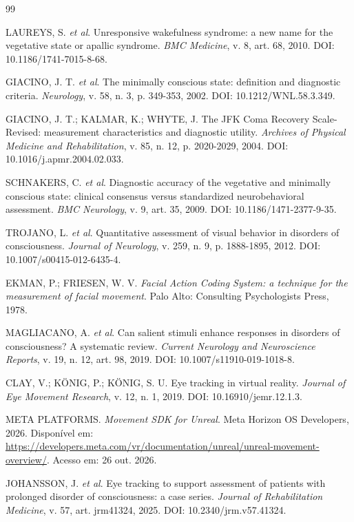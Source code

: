 \documentclass[conference,a4paper,10pt]{IEEEtran}
\begin{document}
\begin{thebibliography}{99}

 LAUREYS, S. \textit{et al}. Unresponsive wakefulness syndrome: a new name for the vegetative state or apallic syndrome. \textit{BMC Medicine}, v. 8, art. 68, 2010. DOI: 10.1186/1741-7015-8-68.

 GIACINO, J. T. \textit{et al}. The minimally conscious state: definition and diagnostic criteria. \textit{Neurology}, v. 58, n. 3, p. 349-353, 2002. DOI: 10.1212/WNL.58.3.349.

 GIACINO, J. T.; KALMAR, K.; WHYTE, J. The JFK Coma Recovery Scale-Revised: measurement characteristics and diagnostic utility. \textit{Archives of Physical Medicine and Rehabilitation}, v. 85, n. 12, p. 2020-2029, 2004. DOI: 10.1016/j.apmr.2004.02.033.

 SCHNAKERS, C. \textit{et al}. Diagnostic accuracy of the vegetative and minimally conscious state: clinical consensus versus standardized neurobehavioral assessment. \textit{BMC Neurology}, v. 9, art. 35, 2009. DOI: 10.1186/1471-2377-9-35.

 TROJANO, L. \textit{et al}. Quantitative assessment of visual behavior in disorders of consciousness. \textit{Journal of Neurology}, v. 259, n. 9, p. 1888-1895, 2012. DOI: 10.1007/s00415-012-6435-4.

 EKMAN, P.; FRIESEN, W. V. \textit{Facial Action Coding System: a technique for the measurement of facial movement}. Palo Alto: Consulting Psychologists Press, 1978.

 MAGLIACANO, A. \textit{et al}. Can salient stimuli enhance responses in disorders of consciousness? A systematic review. \textit{Current Neurology and Neuroscience Reports}, v. 19, n. 12, art. 98, 2019. DOI: 10.1007/s11910-019-1018-8.

 CLAY, V.; KÖNIG, P.; KÖNIG, S. U. Eye tracking in virtual reality. \textit{Journal of Eye Movement Research}, v. 12, n. 1, 2019. DOI: 10.16910/jemr.12.1.3.

 META PLATFORMS. \textit{Movement SDK for Unreal}. Meta Horizon OS Developers, 2026. Disponível em: \url{https://developers.meta.com/vr/documentation/unreal/unreal-movement-overview/}. Acesso em: 26 out. 2026.

 JOHANSSON, J. \textit{et al}. Eye tracking to support assessment of patients with prolonged disorder of consciousness: a case series. \textit{Journal of Rehabilitation Medicine}, v. 57, art. jrm41324, 2025. DOI: 10.2340/jrm.v57.41324.


\end{thebibliography}
\end{document}
